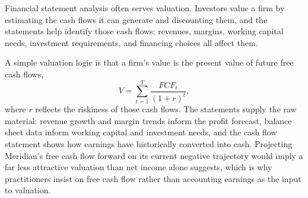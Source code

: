 \documentclass[../ai_in_finance]{subfiles}
\begin{document}
Financial statement analysis often serves valuation. Investors value a firm by estimating the cash flows it can generate and discounting them, and the statements help identify those cash flows: revenues, margins, working capital needs, investment requirements, and financing choices all affect them.

A simple valuation logic is that a firm's value is the present value of future free cash flows,
\begin{equation*}
V = \sum_{t=1}^{T} \frac{FCF_t}{(1+r)^t},
\end{equation*}
where $r$ reflects the riskiness of those cash flows. The statements supply the raw material: revenue growth and margin trends inform the profit forecast, balance sheet data inform working capital and investment needs, and the cash flow statement shows how earnings have historically converted into cash. Projecting Meridian's free cash flow forward on its current negative trajectory would imply a far less attractive valuation than net income alone suggests, which is why practitioners insist on free cash flow rather than accounting earnings as the input to valuation.
\end{document}
